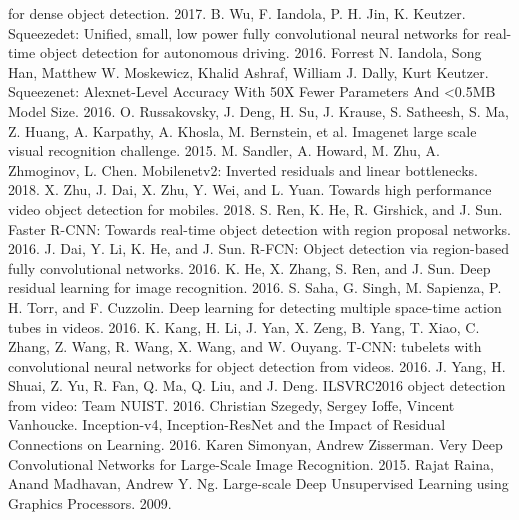 \documentclass[conference]{IEEEtran}
\begin{document}
\begin{thebibliography}{00}
for dense object detection. 2017.
 B. Wu, F. Iandola, P. H. Jin, K. Keutzer. Squeezedet: Unified, small, low power fully convolutional neural networks for real-time object detection for autonomous driving. 2016.
 Forrest N. Iandola, Song Han, Matthew W. Moskewicz, Khalid Ashraf, William J. Dally, Kurt Keutzer. Squeezenet: Alexnet-Level Accuracy With 50X Fewer Parameters And <0.5MB Model Size. 2016.
 O. Russakovsky, J. Deng, H. Su, J. Krause, S. Satheesh, S. Ma, Z. Huang, A. Karpathy, A. Khosla, M. Bernstein, et al. Imagenet large scale visual recognition challenge. 2015.
 M. Sandler, A. Howard, M. Zhu, A. Zhmoginov, L. Chen. Mobilenetv2: Inverted residuals and linear bottlenecks. 2018.
 X. Zhu, J. Dai, X. Zhu, Y. Wei, and L. Yuan. Towards high performance video object detection for mobiles. 2018.
 S. Ren, K. He, R. Girshick, and J. Sun. Faster R-CNN: Towards real-time object detection with region proposal networks. 2016.
 J. Dai, Y. Li, K. He, and J. Sun. R-FCN: Object detection via region-based fully convolutional networks. 2016.
 K. He, X. Zhang, S. Ren, and J. Sun. Deep residual learning for image recognition. 2016.
 S. Saha, G. Singh, M. Sapienza, P. H. Torr, and F. Cuzzolin. Deep learning for detecting multiple space-time action tubes in videos. 2016.
 K. Kang, H. Li, J. Yan, X. Zeng, B. Yang, T. Xiao, C. Zhang, Z. Wang, R. Wang, X. Wang, and W. Ouyang. T-CNN: tubelets with convolutional neural networks for object detection from videos. 2016.
 J. Yang, H. Shuai, Z. Yu, R. Fan, Q. Ma, Q. Liu, and J. Deng. ILSVRC2016 object detection from video: Team NUIST. 2016.
 Christian Szegedy, Sergey Ioffe, Vincent Vanhoucke. Inception-v4, Inception-ResNet and the Impact of Residual Connections on Learning. 2016.
 Karen Simonyan, Andrew Zisserman. Very Deep Convolutional Networks for Large-Scale Image Recognition. 2015.
 Rajat Raina, Anand Madhavan, Andrew Y. Ng. Large-scale Deep Unsupervised Learning using Graphics Processors. 2009.
\vspace{12pt}
\end{thebibliography}
\end{document}
